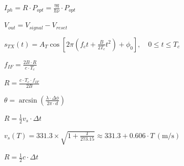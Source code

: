 \documentclass[12pt]{article}
\begin{document}
\vspace*{\fill}
\begin{center}$I_{ph} = R \cdot P_{opt} = \frac{\eta q}{h\nu} \cdot P_{opt}$\end{center}\vspace*{\fill}\newpage
\vspace*{\fill}
\begin{center}$V_{out} = V_{signal} - V_{reset}$\end{center}\vspace*{\fill}\newpage
\vspace*{\fill}
\begin{center}$s_{TX}(t) = A_T \cos\left[2\pi\left(f_c t + \frac{B}{2T_c} t^2\right) + \phi_0\right], \quad 0 \leq t \leq T_c$\end{center}\vspace*{\fill}\newpage
\vspace*{\fill}
\begin{center}$f_{IF} = \frac{2B \cdot R}{c \cdot T_c}$\end{center}\vspace*{\fill}\newpage
\vspace*{\fill}
\begin{center}$R = \frac{c \cdot T_c \cdot f_{IF}}{2B}$\end{center}\vspace*{\fill}\newpage
\vspace*{\fill}
\begin{center}$\theta = \arcsin\left(\frac{\lambda \cdot \Delta\phi}{2\pi \cdot d}\right)$\end{center}\vspace*{\fill}\newpage
\vspace*{\fill}
\begin{center}$R = \frac{1}{2} v_s \cdot \Delta t$\end{center}\vspace*{\fill}\newpage
\vspace*{\fill}
\begin{center}$v_s(T) = 331.3 \times \sqrt{1 + \frac{T}{273.15}} \approx 331.3 + 0.606 \cdot T\ (\text{m/s})$\end{center}\vspace*{\fill}\newpage
\vspace*{\fill}
\begin{center}$R = \frac{1}{2} c \cdot \Delta t$\end{center}\vspace*{\fill}\newpage
\vspace*{\fill}
\end{document}
